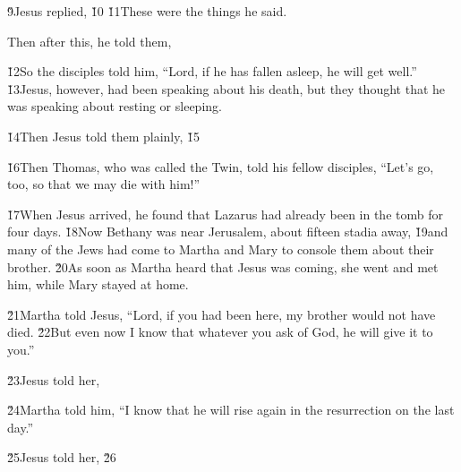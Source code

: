 \v{9}Jesus replied,  \v{10} \v{11}These were the things he said.

Then after this, he told them, 

\v{12}So the disciples told him, ``Lord, if he has fallen asleep, he will get well.'' \v{13}Jesus, however, had been speaking about his death, but they thought that he was speaking about resting or sleeping.

\v{14}Then Jesus told them plainly,  \v{15}

\v{16}Then Thomas, who was called the Twin, told his fellow disciples, ``Let's go, too, so that we may die with him!''

\v{17}When Jesus arrived, he found that Lazarus had already been in the tomb for four days. \v{18}Now Bethany was near Jerusalem, about fifteen stadia away, \v{19}and many of the Jews had come to Martha and Mary to console them about their brother. \v{20}As soon as Martha heard that Jesus was coming, she went and met him, while Mary stayed at home.

\v{21}Martha told Jesus, ``Lord, if you had been here, my brother would not have died. \v{22}But even now I know that whatever you ask of God, he will give it to you.''

\v{23}Jesus told her, 

\v{24}Martha told him, ``I know that he will rise again in the resurrection on the last day.''

\v{25}Jesus told her,   \v{26}

